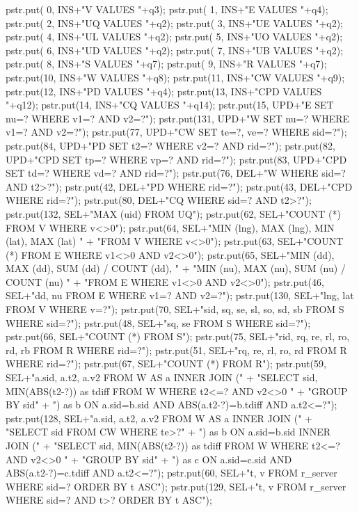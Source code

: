 \documentclass{article}
\theoremstyle{definition}
\begin{document}
  pstr.put( 0, INS+"V VALUES "+q3);
  pstr.put( 1, INS+"E VALUES "+q4);
  pstr.put( 2, INS+"UQ VALUES "+q2);
  pstr.put( 3, INS+"UE VALUES "+q2);
  pstr.put( 4, INS+"UL VALUES "+q2);
  pstr.put( 5, INS+"UO VALUES "+q2);
  pstr.put( 6, INS+"UD VALUES "+q2);
  pstr.put( 7, INS+"UB VALUES "+q2);
  pstr.put( 8, INS+"S VALUES "+q7);
  pstr.put( 9, INS+"R VALUES "+q7);
  pstr.put(10, INS+"W VALUES "+q8);
  pstr.put(11, INS+"CW VALUES "+q9);
  pstr.put(12, INS+"PD VALUES "+q4);
  pstr.put(13, INS+"CPD VALUES "+q12);
  pstr.put(14, INS+"CQ VALUES "+q14);
  pstr.put(15, UPD+"E SET nu=? WHERE v1=? AND v2=?");
  pstr.put(131, UPD+"W SET nu=? WHERE v1=? AND v2=?");
  pstr.put(77, UPD+"CW SET te=?, ve=? WHERE sid=?");
  pstr.put(84, UPD+"PD SET t2=? WHERE v2=? AND rid=?");
  pstr.put(82, UPD+"CPD SET tp=? WHERE vp=? AND rid=?");
  pstr.put(83, UPD+"CPD SET td=? WHERE vd=? AND rid=?");
  pstr.put(76, DEL+"W WHERE sid=? AND t2>?");
  pstr.put(42, DEL+"PD WHERE rid=?");
  pstr.put(43, DEL+"CPD WHERE rid=?");
  pstr.put(80, DEL+"CQ WHERE sid=? AND t2>?");
  pstr.put(132, SEL+"MAX (uid) FROM UQ");
  pstr.put(62, SEL+"COUNT (*) FROM V WHERE v<>0");
  pstr.put(64, SEL+"MIN (lng), MAX (lng), MIN (lat), MAX (lat) "
      + "FROM V WHERE v<>0");
  pstr.put(63, SEL+"COUNT (*) FROM E WHERE v1<>0 AND v2<>0");
  pstr.put(65, SEL+"MIN (dd), MAX (dd), SUM (dd) / COUNT (dd), "
      + "MIN (nu), MAX (nu), SUM (nu) / COUNT (nu) "
      + "FROM E WHERE v1<>0 AND v2<>0");
  pstr.put(46, SEL+"dd, nu FROM E WHERE v1=? AND v2=?");
  pstr.put(130, SEL+"lng, lat FROM V WHERE v=?");
  pstr.put(70, SEL+"sid, sq, se, sl, so, sd, sb FROM S WHERE sid=?");
  pstr.put(48, SEL+"sq, se FROM S WHERE sid=?");
  pstr.put(66, SEL+"COUNT (*) FROM S");
  pstr.put(75, SEL+"rid, rq, re, rl, ro, rd, rb FROM R WHERE rid=?");
  pstr.put(51, SEL+"rq, re, rl, ro, rd FROM R WHERE rid=?");
  pstr.put(67, SEL+"COUNT (*) FROM R");
  pstr.put(59, SEL+"a.sid, a.t2, a.v2 FROM W AS a INNER JOIN ("
      + "SELECT sid, MIN(ABS(t2-?)) as tdiff FROM W WHERE t2<=? AND v2<>0 "
      + "GROUP BY sid"
      + ") as b ON a.sid=b.sid AND ABS(a.t2-?)=b.tdiff AND a.t2<=?");
  pstr.put(128, SEL+"a.sid, a.t2, a.v2 FROM W AS a INNER JOIN ("
      + "SELECT sid FROM CW WHERE te>?"
      + ") as b ON a.sid=b.sid INNER JOIN ("
      + "SELECT sid, MIN(ABS(t2-?)) as tdiff FROM W WHERE t2<=? AND v2<>0 "
      + "GROUP BY sid"
      + ") as c ON a.sid=c.sid AND ABS(a.t2-?)=c.tdiff AND a.t2<=?");
  pstr.put(60, SEL+"t, v FROM r_server WHERE sid=? ORDER BY t ASC");
  pstr.put(129, SEL+"t, v FROM r_server WHERE sid=? AND t>? ORDER BY t ASC");
\end{document}
